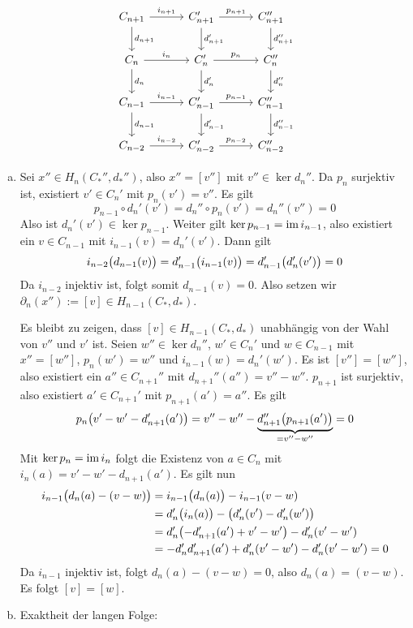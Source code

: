\begin{beweis}
	\[
		\begin{tikzcd}[row sep=2em, column sep=3em]
			C_{n+1} \rar["i_{n+1}"] \dar["d_{n+1}"] & C_{n+1}' \rar["p_{n+1}"] \dar["d_{n+1}'"] & C_{n+1}'' \dar["d_{n+1}''"] \\
			C_n \rar["i_n"] \dar["d_{n}"]& C_n' \rar["p_n"] \dar["d_{n}'"]& C_n'' \dar["d_{n}''"]\\
			C_{n-1} \rar["i_{n-1}"] \dar["d_{n-1}"]& C_{n-1}'  \rar["p_{n-1}"] \dar["d_{n-1}'"]& C_{n-1}'' \dar["d_{n-1}''"]\\
			C_{n-2} \rar["i_{n-2}"]& C_{n-2}' \rar["p_{n-2}"] & C_{n-2}''
		\end{tikzcd}
	\]
	\begin{enumerate}[a)]
		\item Sei $x'' \in H_n(C_*'',d_*'')$, also $x'' = [v'']$ mit $v'' \in \ker d_n''$. Da $p_n$ surjektiv ist, existiert $v' \in C_n'$ mit $p_n(v')=v''$. Es gilt
		\[
			p_{n-1} \circ d_n'(v') = d_n'' \circ p_n(v') = d_n''(v'') = 0
		\]
		Also ist $d_n'(v') \in \ker p_{n-1}$. Weiter gilt $\ker p_{n-1}= \im i_{n-1}$, also existiert ein $ v\in C_{n-1}$ mit $i_{n-1}(v)= d_n'(v')$. Dann gilt
		\[
			i_{n-2} \enbrace[\big]{d_{n-1}(v)} = d'_{n-1} \enbrace[\big]{i_{n-1}(v)} = d_{n-1}' \enbrace[\big]{d_n'(v')} = 0   
		\]
		Da $i_{n-2}$ injektiv ist, folgt somit $d_{n-1}(v)=0$. Also setzen wir $\partial_n(x'') := [v] \in H_{n-1}(C_*,d_*)$. 
	
		Es bleibt zu zeigen, dass $[v] \in H_{n-1}(C_*,d_*)$ unabhängig von der Wahl von $v''$ und $v'$ ist.
		Seien $w'' \in \ker d_n''$, $w' \in C_n'$ und  $w \in C_{n-1}$ mit $x''=[w'']$, $p_n(w')=w''$ und $i_{n-1}(w)= d_n'(w')$.
		Es ist $[v'']=[w'']$, also existiert ein $a'' \in C_{n+1}''$ mit $d_{n+1}'' (a'')=v'' - w''$. $p_{n+1}$ ist surjektiv, also existiert $a' \in C_{n+1}'$ mit
		$p_{n+1}(a')=a''$. Es gilt
		\[
			p_n \enbrace[\big]{v'-w'- d_{n+1}'(a')} = v'' - w'' - \underbrace{d_{n+1}'' \enbrace[\big]{p_{n+1}(a')}}_{=v''- w''} = 0
		\]
		Mit $\ker p_n = \im i_n$ folgt die Existenz von $a \in C_n$ mit $i_n(a)=v'- w' - d_{n+1}(a')$. Es gilt nun %
		\begin{align*}
			i_{n-1} \enbrace[\big]{d_n(a)- (v-w)} & = i_{n-1} \enbrace[\big]{d_n(a)} - i_{n-1}(v-w) \\ &= d_n' \enbrace[\big]{i_n(a)} - \enbrace[\big]{d_n'(v')- d_n'(w')}  \\  
			&= d_n' \enbrace*{ -d_{n+1}'(a') + v'-w'} - d_n' \enbrace*{v' - w'}  \\
			&= -d_n' d_{n+1}' (a') + d_n'(v'- w') -  d_n'(v'-w') = 0
		\end{align*}
		Da $i_{n-1}$ injektiv ist, folgt $d_n(a)- (v-w) = 0$, also $d_n(a)=(v-w)$. Es folgt $[v]=[w]$.
		\item Exaktheit der langen Folge:
		\begin{description}[wide=0cm]
			\item[{$\boxed{\im (i_n)_* = \ker (p_n)_*}$ :}] 
			\enquote{$\subseteq$} folgt aus $(p_n)_* \circ (i_n)_* = \enbrace*{p_n \circ i_n}_* = (0)_* =0 $.
		

\end{description}
\end{enumerate}
\end{beweis}
